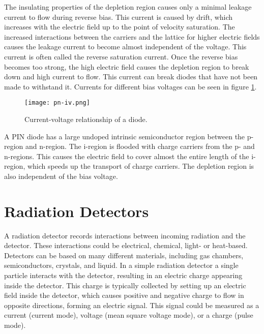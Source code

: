 \documentclass[../main/thesis.tex]{subfiles}
\begin{document}
The insulating properties of the depletion region causes only a minimal leakage current to flow during reverse bias. This current is caused by drift, which increases with the electric field up to the point of velocity saturation. The increased interactions between the carriers and the lattice for higher electric fields causes the leakage current to become almost independent of the voltage. This current is often called the reverse saturation current. Once the reverse bias becomes too strong, the high electric field causes the depletion region to break down and high current to flow. This current can break diodes that have not been made to withstand it. Currents for different bias voltages can be seen in figure \ref{fig-pn-iv}. \citep[chap. 1]{analogbok}

\begin{figure}%
	\centering
	\texttt{[image: pn-iv.png]}
	\caption{Current-voltage relationship of a diode. \citetext{\citeauthor{SparkFun}}}
	\label{fig-pn-iv}
\end{figure}

A PIN diode has a large undoped intrinsic semiconductor region between the p-region and n-region. The i-region is flooded with charge carriers from the p- and n-regions. This causes the electric field to cover almost the entire length of the i-region, which speeds up the transport of charge carriers. The depletion region is also independent of the bias voltage. \citep{pin}

\section{Radiation Detectors}
\label{t-detector}
A radiation detector records interactions between incoming radiation and the detector. These interactions could be electrical, chemical, light- or heat-based. Detectors can be based on many different materials, including gas chambers, semiconductors, crystals, and liquid. In a simple radiation detector a single particle interacts with the detector, resulting in an electric charge appearing inside the detector. This charge is typically collected by setting up an electric field inside the detector, which causes positive and negative charge to flow in opposite directions, forming an electric signal. This signal could be measured as a current (current mode), voltage (mean square voltage mode), or a charge (pulse mode). \citep[chap. 4]{Knoll}
\end{document}

